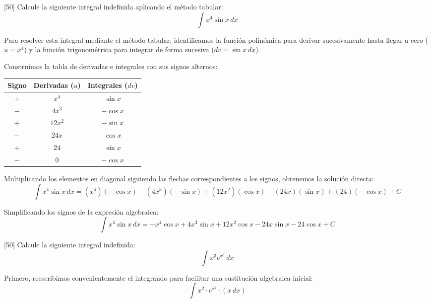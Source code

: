 \documentclass[11pt,paper=a4,answers, addpoints]{exam}
\begin{document}
\begin{questions}

[50]
Calcule la siguiente integral indefinida aplicando el método tabular:
\[ \int x^4 \sin x \, dx \]

\begin{solution}
Para resolver esta integral mediante el método tabular, identificamos la función polinómica para derivar sucesivamente hasta llegar a cero ($u = x^4$) y la función trigonométrica para integrar de forma sucesiva ($dv = \sin x \, dx$).

Construimos la tabla de derivadas e integrales con sus signos alternos:

\begin{center}
\begin{tabular}{|c|c|c|}
\hline
\textbf{Signo} & \textbf{Derivadas ($u$)} & \textbf{Integrales ($dv$)} \\ \hline
$+$ & $x^4$   & $\sin x$   \\ \hline
$-$ & $4x^3$  & $-\cos x$  \\ \hline
$+$ & $12x^2$ & $-\sin x$  \\ \hline
$-$ & $24x$   & $\cos x$   \\ \hline
$+$ & $24$    & $\sin x$   \\ \hline
$-$ & $0$     & $-\cos x$  \\ \hline
\end{tabular}
\end{center}

Multiplicando los elementos en diagonal siguiendo las flechas correspondientes a los signos, obtenemos la solución directa:
\[ \int x^4 \sin x \, dx = (x^4)(-\cos x) - (4x^3)(-\sin x) + (12x^2)(\cos x) - (24x)(\sin x) + (24)(-\cos x) + C \]

Simplificando los signos de la expresión algebraica:
\[ \int x^4 \sin x \, dx = -x^4 \cos x + 4x^3 \sin x + 12x^2 \cos x - 24x \sin x - 24 \cos x + C \]
\end{solution}

\vspace{0.5cm}

[50]
Calcule la siguiente integral indefinida:
\[ \int x^3 e^{x^2} \, dx \]

\begin{solution}
Primero, reescribimos convenientemente el integrando para facilitar una sustitución algebraica inicial:
\[ \int x^2 \cdot e^{x^2} \cdot (x \, dx) \]


\end{solution}
\end{questions}
\end{document}
